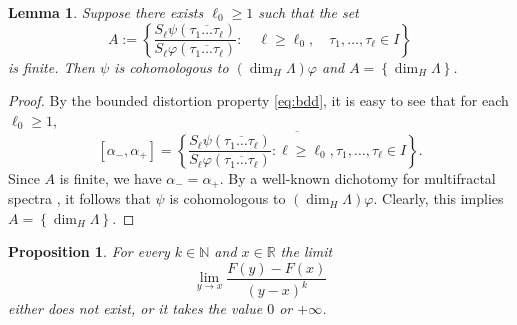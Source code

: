 \documentclass[11pt]{amsart}
\newcommand{\1}{1}
\newtheorem{lemma}[theorem]{Lemma}
\newtheorem{proposition}[theorem]{Proposition}
\begin{document}
\begin{lemma} \label{lem:cohom-1} 
Suppose there exists $\ell_0\ge 1$ such that the set
\[
A:=\left\{\frac{S_{\ell}\psi\left(\overline{\tau_{1}\dots \tau_{\ell}}\right)}{S_{\ell}\varphi\left(\overline{\tau_{1}\dots \tau_{\ell}}\right)}:\quad \ell \ge \ell_0,\quad \tau_1, \dots, \tau_\ell \in I \right\}
\]
is finite.
Then $\psi$ is cohomologous to $(\dim_{H}\Lambda)\varphi$  and $ A=\left\{\dim_{H}\Lambda\right\} $.
\end{lemma}

\begin{proof}
By the bounded distortion property \eqref{eq:bdd}, it is easy to see that for each
$\ell_{0}\ge1$,
\[
[\alpha_{-},\alpha_{+}]=\overline{\left\{ \frac{S_{\ell}\psi\left(\overline{\tau_{1}\dots \tau_{\ell}}\right)}{S_{\ell}\varphi\left(\overline{\tau_{1}\dots \tau_{\ell}}\right)}:\ell\ge\ell_{0},\tau_{1},\dots,\tau_{\ell}\in I\right\} }.
\]
Since $A$ is finite, we have $\alpha_-=\alpha_+$. By a well-known dichotomy for multifractal spectra  \cite{Pesin-Weiss-97a}, {it follows} that $\psi$ is cohomologous to $(\dim_{H}\Lambda)\varphi$. Clearly, this implies $A=\left\{\dim_{H}\Lambda\right\}$.
\end{proof}

\begin{proposition} \label{prop:no-positive-derivative}
For every $k\in\mathbb{N}$ and $x\in\mathbb{R}$ the limit 
\[
\lim_{y\rightarrow x}\frac{F(y)-F(x)}{(y-x)^{k}}
\]
either does not exist, or it takes the value $0$ or $+\infty$. 
\end{proposition}
\end{document}
